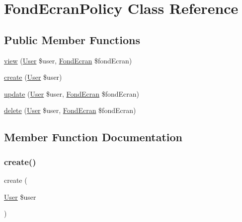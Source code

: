 \hypertarget{class_app_1_1_policies_1_1_fond_ecran_policy}{}\section{Fond\+Ecran\+Policy Class Reference}
\label{class_app_1_1_policies_1_1_fond_ecran_policy}
\subsection*{Public Member Functions}
\begin{DoxyCompactItemize}
\item 
\mbox{\hyperlink{class_app_1_1_policies_1_1_fond_ecran_policy_a334733e94e973bdaeb5ecb41caeb38d5}{view}} (\mbox{\hyperlink{class_app_1_1_user}{User}} \$user, \mbox{\hyperlink{class_app_1_1_fond_ecran}{Fond\+Ecran}} \$fond\+Ecran)
\item 
\mbox{\hyperlink{class_app_1_1_policies_1_1_fond_ecran_policy_a7626db07d2ee9a50d2839c019dbf037d}{create}} (\mbox{\hyperlink{class_app_1_1_user}{User}} \$user)
\item 
\mbox{\hyperlink{class_app_1_1_policies_1_1_fond_ecran_policy_ab32ff987dce667d8faa2a5ac9a7e8d46}{update}} (\mbox{\hyperlink{class_app_1_1_user}{User}} \$user, \mbox{\hyperlink{class_app_1_1_fond_ecran}{Fond\+Ecran}} \$fond\+Ecran)
\item 
\mbox{\hyperlink{class_app_1_1_policies_1_1_fond_ecran_policy_a524f68543406e6ff59ef73639cb2fc68}{delete}} (\mbox{\hyperlink{class_app_1_1_user}{User}} \$user, \mbox{\hyperlink{class_app_1_1_fond_ecran}{Fond\+Ecran}} \$fond\+Ecran)
\end{DoxyCompactItemize}


\subsection{Member Function Documentation}
\mbox{\label{class_app_1_1_policies_1_1_fond_ecran_policy_a7626db07d2ee9a50d2839c019dbf037d}} 
\subsubsection{\texorpdfstring{create()}{create()}}
{\footnotesize\ttfamily create (\begin{DoxyParamCaption}\item[{\mbox{\hyperlink{class_app_1_1_user}{User}}}]{\$user }\end{DoxyParamCaption})}

